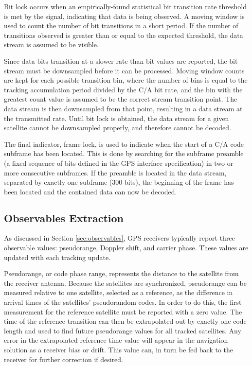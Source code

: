 \documentclass[12pt]{article}
\begin{document}
Bit lock occurs when an empirically-found statistical bit transition rate threshold is met by the signal, indicating that data is being observed. A moving window is used to count the number of bit transitions in a short period. If the number of transitions observed is greater than or equal to the expected threshold, the data stream is assumed to be visible.

Since data bits transition at a slower rate than bit values are reported, the bit stream must be downsampled before it can be processed. Moving window counts are kept for each possible transition bin, where the number of bins is equal to the tracking accumulation period divided by the C/A bit rate, and the bin with the greatest count value is assumed to be the correct stream transition point. The data stream is then downsampled from that point, resulting in a data stream at the transmitted rate. Until bit lock is obtained, the data stream for a given satellite cannot be downsampled properly, and therefore cannot be decoded.

The final indicator, frame lock, is used to indicate when the start of a C/A code subframe has been located. This is done by searching for the subframe preamble (a fixed sequence of bits defined in the GPS interface specification) in two or more consecutive subframes. If the preamble is located in the data stream, separated by exactly one subframe (300 bits), the beginning of the frame has been located and the contained data can now be decoded. \cite{navstar}

\subsection{Observables Extraction}
As discussed in Section \ref{sec:observables}, GPS receivers typically report three observable values: pseudorange, Doppler shift, and carrier phase. These values are updated with each tracking update.

Pseudorange, or code phase range, represents the distance to the satellite from the receiver antenna. Because the satellites are synchronized, pseudorange can be measured relative to one satellite, selected as a reference, as the difference in arrival times of the satellites' pseudorandom codes. In order to do this, the first measurement for the reference satellite must be reported with a zero value. The time of the reference transition can then be extrapolated out by exactly one code length and used to find future pseudorange values for all tracked satellites. Any error in the extrapolated reference time value will appear in the navigation solution as a receiver bias or drift. This value can, in turn be fed back to the receiver for further correction if desired.
\end{document}
